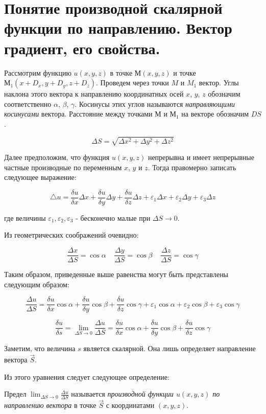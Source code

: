 \section{Понятие производной скалярной функции по направлению. Вектор градиент, его свойства.}

Рассмотрим функцию $u(x, y, z)$ в точке $М(x,y,z)$ и точке $М_1(x+D_x,y+D_y,z+D_z)$. 
Проведем через точки $M$ и $M_1$ вектор. Углы наклона этого вектора к направлению координатных осей $x$, $y$, $z$ обозначим соответственно $\alpha$, $\beta$, $\gamma$. 
Косинусы этих углов называются \textit{направляющими косинусами} вектора.
Расстояние между точками $М$ и $М_1$ на векторе обозначим $DS$.

$$\Delta{S}=\sqrt{\Delta{x^2}+\Delta{y^2}+\Delta{z^2}}$$

Далее предположим, что функция $u(x,y,z)$ непрерывна и имеет непрерывные частные производные по переменным $x$, $y$ и $z$. 
Тогда правомерно записать следующее выражение:

$$\triangle{u}=\frac{\delta{u}}{\delta{x}}\Delta{x}+\frac{\delta{u}}{\delta{y}}\Delta{y}+\frac{\delta{u}}{\delta{z}}\Delta{z}+\varepsilon_1\Delta{x}+\varepsilon_2\Delta{y}+\varepsilon_3\Delta{z}$$

где величины $\varepsilon_1,\varepsilon_2,\varepsilon_3$ - бесконечно малые при $\Delta{S}\rightarrow{0}$.

Из геометрических соображений очевидно:

$$\frac{\Delta{x}}{\Delta{S}}=\cos{\alpha}\;\;\;\;\frac{\Delta{y}}{\Delta{S}}=\cos{\beta}\;\;\;\;\frac{\Delta{z}}{\Delta{S}}=\cos{\gamma}$$

Таким образом, приведенные выше равенства могут быть представлены следующим образом:

$$\frac{\Delta{u}}{\Delta{S}}=\frac{\delta{u}}{\delta{x}}\cos{\alpha}+\frac{\delta{u}}{\delta{y}}\cos{\beta}+\frac{\delta{u}}{\delta{z}}\cos{\gamma}+\varepsilon_1\cos{\alpha}+\varepsilon_2\cos{\beta}+\varepsilon_3\cos{\gamma}$$

$$\frac{\delta{u}}{\delta{s}}=\lim_{\Delta{S}\to{0}}\frac{\Delta{u}}{\Delta{S}}=\frac{\delta{u}}{\delta{x}}\cos{\alpha}+\frac{\delta{u}}{\delta{y}}\cos{\beta}+\frac{\delta{u}}{\delta{z}}\cos{\gamma}$$

Заметим, что величина $s$ является скалярной. Она лишь определяет направление вектора $\vec{S}$.

Из этого уравнения следует следующее определение:

\begin{definition}
    Предел $\lim_{\Delta{S}\to{0}}\frac{\Delta{u}}{\Delta{S}}$ называется \textit{производной функции $u(x,y,z)$ по направлению вектора} 
    в точке $\vec{S}$ с координатами $(x,y,z)$.
\end{definition}

